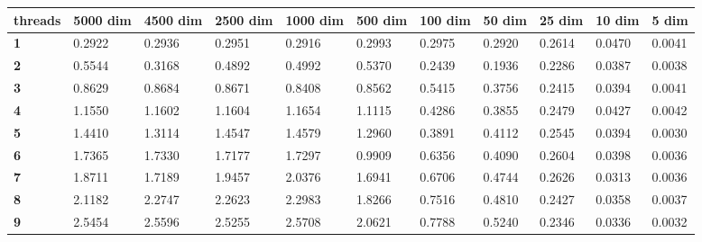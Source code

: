\begin{table}[ht]
\centering
\begin{tabular}{|l|l|l|l|l|l|l|l|l|l|l|}
\hline
\textbf{threads} & \textbf{5000 dim} & \textbf{4500 dim} & \textbf{2500 dim} & \textbf{1000 dim} & \textbf{500 dim} & \textbf{100 dim} & \textbf{50 dim} & \textbf{25 dim} & \textbf{10 dim} & \textbf{5 dim} \\ \hline
\textbf{1}       & 0.2922            & 0.2936            & 0.2951            & 0.2916            & 0.2993           & 0.2975           & 0.2920          & 0.2614          & 0.0470          & 0.0041         \\ \hline
\textbf{2}       & 0.5544            & 0.3168            & 0.4892            & 0.4992            & 0.5370           & 0.2439           & 0.1936          & 0.2286          & 0.0387          & 0.0038         \\ \hline
\textbf{3}       & 0.8629            & 0.8684            & 0.8671            & 0.8408            & 0.8562           & 0.5415           & 0.3756          & 0.2415          & 0.0394          & 0.0041         \\ \hline
\textbf{4}       & 1.1550            & 1.1602            & 1.1604            & 1.1654            & 1.1115           & 0.4286           & 0.3855          & 0.2479          & 0.0427          & 0.0042         \\ \hline
\textbf{5}       & 1.4410            & 1.3114            & 1.4547            & 1.4579            & 1.2960           & 0.3891           & 0.4112          & 0.2545          & 0.0394          & 0.0030         \\ \hline
\textbf{6}       & 1.7365            & 1.7330            & 1.7177            & 1.7297            & 0.9909           & 0.6356           & 0.4090          & 0.2604          & 0.0398          & 0.0036         \\ \hline
\textbf{7}       & 1.8711            & 1.7189            & 1.9457            & 2.0376            & 1.6941           & 0.6706           & 0.4744          & 0.2626          & 0.0313          & 0.0036         \\ \hline
\textbf{8}       & 2.1182            & 2.2747            & 2.2623            & 2.2983            & 1.8266           & 0.7516           & 0.4810          & 0.2427          & 0.0358          & 0.0037         \\ \hline
\textbf{9}       & 2.5454            & 2.5596            & 2.5255            & 2.5708            & 2.0621           & 0.7788           & 0.5240          & 0.2346          & 0.0336          & 0.0032         \\ \hline

\end{tabular}
\end{table}
